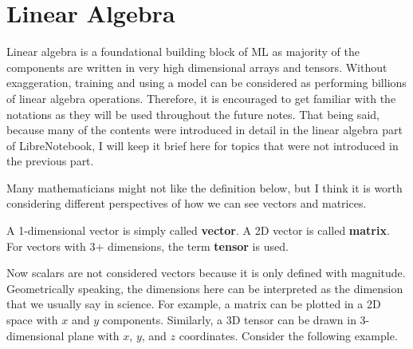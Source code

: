 \documentclass[../../../main.tex]{subfiles}
\begin{document}
\section{Linear Algebra}

Linear algebra is a foundational building block of ML as majority
of the components are written in very high dimensional arrays
and tensors. Without exaggeration, training and using a model
can be considered as performing billions of linear algebra
operations. Therefore, it is encouraged to get familiar with
the notations as they will be used throughout the future notes.
That being said, because many of the contents were introduced
in detail in the linear algebra part of LibreNotebook, I will
keep it brief here for topics that were not introduced in the
previous part.

Many mathematicians might not like the definition below, but I think
it is worth considering different perspectives of how we can see
vectors and matrices.

\begin{definition}{}{}
A 1-dimensional vector is simply called \textbf{vector}. A 2D vector
is called \textbf{matrix}. For vectors with 3+ dimensions, the term
\textbf{tensor} is used.
\end{definition}

Now scalars are not considered vectors because it is only defined
with magnitude. Geometrically speaking, the dimensions here can be
interpreted as the dimension that we usually say in science.
For example, a matrix can be plotted in a 2D space with $x$ and $y$
components. Similarly, a 3D tensor can be drawn in 3-dimensional
plane with $x$, $y$, and $z$ coordinates. Consider the following
example.

\begin{figure}[H]
\centering
{}
\end{figure}
\end{document}

